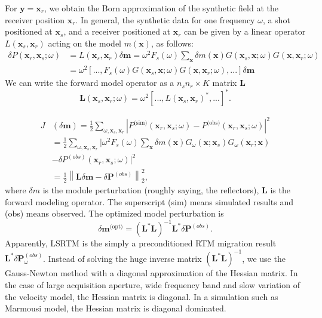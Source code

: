 \documentclass[11pt]{article}
\newcommand{\bx}{\boldsymbol{x}}
\newcommand{\by}{\boldsymbol{y}}
\newcommand{\bL}{\boldsymbol{L}}
\newcommand{\bm}{\boldsymbol{m}}
\newcommand{\bP}{\boldsymbol{P}}
\theoremstyle{plain}
\theoremstyle{definition}
\theoremstyle{remark}
\numberwithin{equation}{section}
\begin{document}
For $\by=\bx_r$, we obtain the Born approximation of the synthetic field at the receiver position $\bx_r$. In general, the synthetic data for one frequency $\omega$, a shot positioned at $\bx_s$, and a receiver positioned at $\bx_r$ can be given by a linear operator $L(\bx_s,\bx_r)$ acting on the model $m(\bx)$, as follows:
\begin{align}
\delta P(\bx_r,\bx_s;\omega)&=L(\bx_s,\bx_r)\delta \bm=\omega^2 F_s(\omega)\sum_{\bx}\delta m(\bx)G(\bx_s,\bx;\omega)G(\bx,\bx_r;\omega)\nonumber\\
&=\omega^2 [...,F_s(\omega)G(\bx_s,\bx;\omega)G(\bx,\bx_r;\omega),...]\delta \bm
\end{align} 
We can write the forward model operator as a $n_s n_r\times K$ matrix $\bL$
\begin{equation}\label{Loperator}
\bL(\bx_s,\bx_r;\omega) = \omega^2 [...,L(\bx_s,\bx_r)^*,...]^*.
\end{equation}




  \begin{equation}
  \begin{aligned}
  J&(\delta \bm) = \frac{1}{2} \sum\limits_{\omega,\bx_s,\bx_r}  \left| P^{\text{(sim)}}(\bx_r, \bx_s; \omega) - P^{\text{(obs)}}(\bx_r, \bx_s; \omega) \right|^2 \\
  &= \frac{1}{2} \sum\limits_{\omega,\bx_s,\bx_r} \Big| \omega^2 F_s(\omega) \sum\limits_{\bx}\delta m(\bx)G_{\omega}(\bx; \bx_s)G_{\omega}(\bx_r; \bx) \\&- \delta P^{(obs)}(\bx_r, \bx_s; \omega) \Big|^2\\
  &= \frac{1}{2} \left\| \bL\delta \bm - \delta\bP^{(obs)}\right\|_2^2,
  \end{aligned}
  \end{equation}
  where $\delta m$ is the module perturbation (roughly saying, the reflectors), $\bL$ is the forward modeling operator. The superscript (sim) means simulated results and (obs) means
  observed. The optimized model perturbation is 
    \begin{equation}
    \delta \bm^{\text{(opt)}} = \left( \bL^{*}\bL \right)^{-1} \bL^{*} \delta\bP^{(obs)}.
    \end{equation}
    Apparently, LSRTM is the simply a preconditioned RTM migration result $\bL^{*}\delta \bP^{(obs)}_{\omega}$. 
    Instead of solving the huge inverse matrix $(\bL^{*}\bL)^{-1}$,  we use the Gauss-Newton method with a diagonal approximation 
    of the Hessian matrix. In the case of large acquisition aperture, wide frequency band and slow variation of the velocity model, the Hessian matrix
    is diagonal. In a simulation such as Marmousi model, the Hessian matrix is diagonal dominated. 
\end{document}
